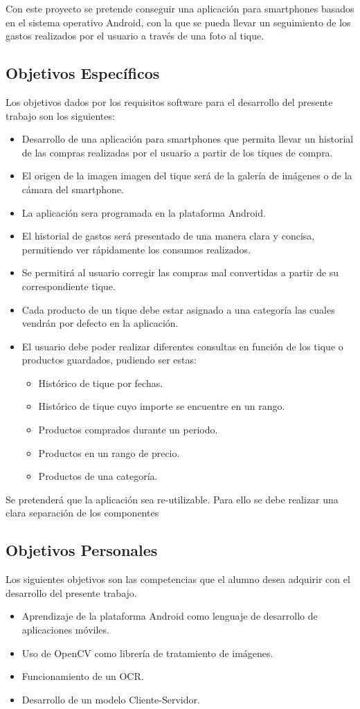 
Con este proyecto se pretende conseguir una aplicación para smartphones basados en el sistema operativo  Android, con la que se pueda llevar un seguimiento de los gastos realizados por el usuario a través de una foto al tique.

\subsection{Objetivos Específicos}
Los objetivos dados por los requisitos software para el desarrollo del presente trabajo son los siguientes: 
\begin{itemize}
	\item Desarrollo de una aplicación para smartphones que permita llevar un historial de las compras realizadas por el usuario a partir de los tiques de compra.
	\item El origen de la imagen imagen del tique será de la galería de imágenes o de la cámara del smartphone.
	\item La aplicación sera programada en la plataforma Android.
	\item El historial de gastos será presentado de una manera clara y concisa, permitiendo ver rápidamente los consumos realizados.
	\item Se permitirá al usuario corregir las compras mal convertidas a partir de su correspondiente tique.
	\item Cada producto de un tique debe estar asignado a una categoría las cuales vendrán por defecto en la aplicación. 
	\item El usuario debe poder realizar diferentes consultas en función de los tique o productos guardados, pudiendo ser estas:
		\begin{itemize}
			\item Histórico de tique por fechas.
			\item Histórico de tique cuyo importe se encuentre en un rango.
			\item Productos comprados durante un periodo.
			\item Productos en un rango de precio.
			\item Productos de una categoría.
		\end{itemize}
\end{itemize}
Se pretenderá que la aplicación sea re-utilizable. Para ello se debe realizar una clara separación de los componentes 
\subsection{Objetivos Personales}
Los siguientes objetivos son las competencias que el alumno desea adquirir con el desarrollo del presente trabajo.
\begin{itemize}
	\item Aprendizaje de la plataforma Android como lenguaje de desarrollo de aplicaciones móviles. 
	\item Uso de OpenCV como librería de tratamiento de imágenes.
	\item Funcionamiento de un OCR.
	\item Desarrollo de un modelo Cliente-Servidor.
\end{itemize}

